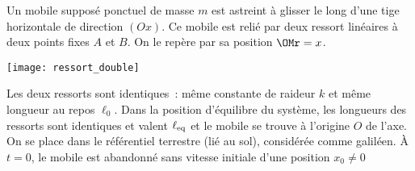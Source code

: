 \documentclass[a4paper, 12pt, final, garamond]{book}
\begin{document}
Un mobile supposé ponctuel de masse $m$ est astreint à glisser le long d'une
tige horizontale de direction $(Ox)$. Ce mobile est relié par deux ressort
linéaires à deux points fixes $A$ et $B$. On le repère par sa position $\OMr =
	x$.

\begin{center}
	\texttt{[image: ressort\_double]}
\end{center}

Les deux ressorts sont identiques~: même constante de raideur $k$ et même
longueur au repos $\ell_0$. Dans la position d'équilibre du système, les
longueurs des ressorts sont identiques et valent $\ell_{\rm eq}$ et le mobile se
trouve à l'origine $O$ de l'axe. On se place dans le référentiel terrestre (lié
au sol), considérée comme galiléen. À $t = 0$, le mobile est abandonné sans
vitesse initiale d'une position $x_0 \neq 0$
\end{document}
